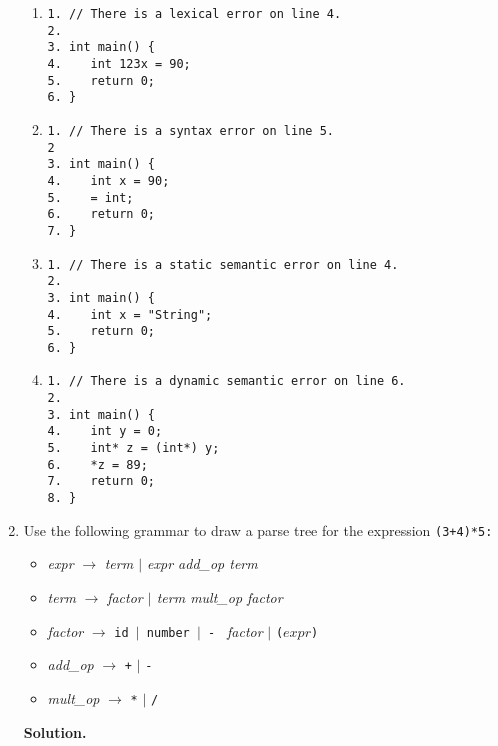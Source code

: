 \documentclass[9pt]{article}
\begin{document}
\begin{enumerate}
      \begin{enumerate}
         \item \begin{verbatim}
1. // There is a lexical error on line 4.
2.
3. int main() {
4.    int 123x = 90;
5.    return 0;
6. }
         \end{verbatim}
         \item \begin{verbatim}
1. // There is a syntax error on line 5.
2
3. int main() {
4.    int x = 90;
5.    = int;
6.    return 0;
7. }
         \end{verbatim}
         \item \begin{verbatim}
1. // There is a static semantic error on line 4.
2.
3. int main() {
4.    int x = "String";
5.    return 0;
6. }
         \end{verbatim}
         \item \begin{verbatim}
1. // There is a dynamic semantic error on line 6.
2.
3. int main() {
4.    int y = 0;
5.    int* z = (int*) y;
6.    *z = 89;
7.    return 0;
8. }
         \end{verbatim}
      \end{enumerate}
   \item Use the following grammar to draw a parse tree for the expression
         \verb|(3+4)*5:|

         \begin{itemize}
            \item \textit{expr} $\rightarrow$ \textit{term $|$ expr add\_op term}
            \item \textit{term} $\rightarrow$ \textit{factor $|$ term mult\_op 
                  factor}
            \item \textit{factor} $\rightarrow$ \texttt{id $|$  number $|$ - }
                  \textit{factor} $|$ \verb|(|$expr$\verb|)|
            \item \textit{add\_op} $\rightarrow$ \verb|+| $|$ \verb|-|
            \item \textit{mult\_op} $\rightarrow$ \verb|*| $|$ \verb|/|
         \end{itemize}
         
      \textbf{Solution.}
      
      \begin{center}
\end{center}
\end{enumerate}
\end{document}
